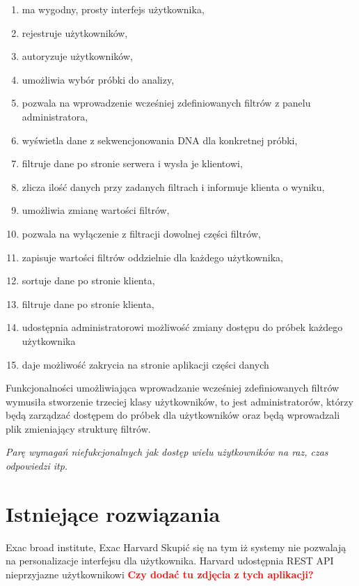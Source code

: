 \documentclass[a4paper,12pt,twoside]{article}
\begin{document}
 \begin{enumerate}[1)]
 \item ma wygodny, prosty interfejs użytkownika,
 \item rejestruje użytkowników,
 \item autoryzuje użytkowników,
 \item umożliwia wybór próbki do analizy,
 \item pozwala na wprowadzenie wcześniej zdefiniowanych filtrów z panelu administratora,
 \item wyświetla dane z sekwencjonowania DNA dla konkretnej próbki,
 \item filtruje dane po stronie serwera i wysła je klientowi,
 \item zlicza ilość danych przy zadanych filtrach i informuje klienta o wyniku,
 \item umożliwia zmianę wartości filtrów,
 \item pozwala na wyłączenie z filtracji dowolnej części filtrów,
 \item zapisuje wartości filtrów oddzielnie dla każdego użytkownika,
 \item sortuje dane po stronie klienta,
 \item filtruje dane po stronie klienta,
 \item udostępnia administratorowi możliwość zmiany dostępu do próbek 
 każdego użytkownika
 \item daje możliwość zakrycia na stronie aplikacji części danych	
 \end{enumerate}
 
\newpage
Funkcjonalności umożliwiająca wprowadzanie wcześniej zdefiniowanych filtrów wymusiła stworzenie
trzeciej klasy użytkowników, to jest administratorów, którzy będą zarządzać dostępem do próbek dla 
użytkowników oraz będą wprowadzali plik zmieniający strukturę filtrów.

\newpage
\textit{
Parę wymagań niefukcjonalnych jak dostęp wielu użytkowników na raz, czas odpowiedzi itp.}
\newpage
\section{Istniejące rozwiązania}  

Exac broad institute, Exac Harvard  
Skupić się na tym iż systemy nie pozwalają na personalizacje interfejsu dla użytkownika.
Harvard udostępnia REST API nieprzyjazne użytkownikowi \newline
\textcolor{red}{\textbf{Czy dodać tu zdjęcia z tych aplikacji?}}
\end{document}
